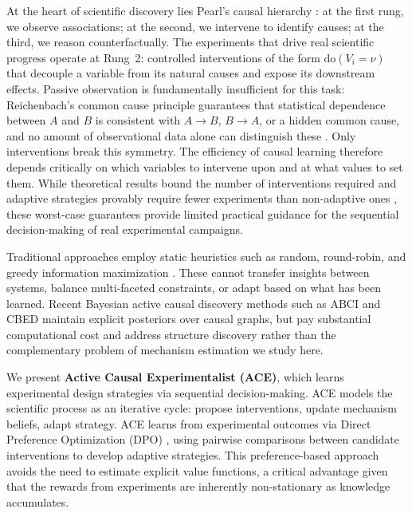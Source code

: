 \documentclass{article}
\theoremstyle{plain}
\theoremstyle{definition}
\theoremstyle{remark}
\begin{document}
At the heart of scientific discovery lies Pearl's causal hierarchy \citep{pearl2009causality,pearl2018book}: at the first rung, we observe associations; at the second, we intervene to identify causes; at the third, we reason counterfactually. The experiments that drive real scientific progress operate at Rung~2: controlled interventions of the form $\text{do}(V_i = \nu)$ that decouple a variable from its natural causes and expose its downstream effects. Passive observation is fundamentally insufficient for this task: Reichenbach's common cause principle \citep{reichenbach1956} guarantees that statistical dependence between $A$ and $B$ is consistent with $A \to B$, $B \to A$, or a hidden common cause, and no amount of observational data alone can distinguish these \citep{spirtes2000causation,peters2017elements}. Only interventions break this symmetry. The efficiency of causal learning therefore depends critically on which variables to intervene upon and at what values to set them. While theoretical results bound the number of interventions required \citep{eberhardt2005number,eberhardt2006n} and adaptive strategies provably require fewer experiments than non-adaptive ones \citep{hauser2012characterization}, these worst-case guarantees provide limited practical guidance for the sequential decision-making of real experimental campaigns.

Traditional approaches employ static heuristics such as random, round-robin, and greedy information maximization \citep{murphy2001active,hauser2012characterization}. These cannot transfer insights between systems, balance multi-faceted constraints, or adapt based on what has been learned. Recent Bayesian active causal discovery methods such as ABCI \citep{toth2022active} and CBED \citep{tigas2022interventions} maintain explicit posteriors over causal graphs, but pay substantial computational cost and address structure discovery rather than the complementary problem of mechanism estimation we study here.

We present \textbf{Active Causal Experimentalist (ACE)}, which learns experimental design strategies via sequential decision-making. ACE models the scientific process as an iterative cycle: propose interventions, update mechanism beliefs, adapt strategy. ACE learns from experimental outcomes via Direct Preference Optimization (DPO) \citep{rafailov2023direct}, using pairwise comparisons between candidate interventions to develop adaptive strategies. This preference-based approach avoids the need to estimate explicit value functions, a critical advantage given that the rewards from experiments are inherently non-stationary as knowledge accumulates.
\end{document}
